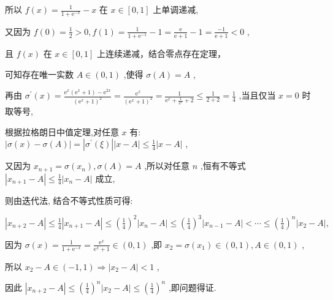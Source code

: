 \documentclass[10pt]{article}
\begin{document}
所以 \(f\left( x\right)  = \frac{1}{1 + {\mathrm{e}}^{-x}} - x\) 在 \(x \in  \left\lbrack  {0,1}\right\rbrack\) 上单调递减,

又因为 \(f\left( 0\right)  = \frac{1}{2} > 0,f\left( 1\right)  = \frac{1}{1 + {\mathrm{e}}^{-1}} - 1 = \frac{\mathrm{e}}{\mathrm{e} + 1} - 1 = \frac{-1}{\mathrm{e} + 1} < 0\) ,

且 \(f\left( x\right)\) 在 \(x \in  \left\lbrack  {0,1}\right\rbrack\) 上连续递减，结合零点存在定理，

可知存在唯一实数 \(A \in  \left( {0,1}\right)\) ,使得 \(\sigma \left( A\right)  = A\) ,

再由 \({\sigma }^{\prime }\left( x\right)  = \frac{{\mathrm{e}}^{x}\left( {{\mathrm{e}}^{x} + 1}\right)  - {\mathrm{e}}^{2x}}{{\left( {\mathrm{e}}^{x} + 1\right) }^{2}} = \frac{{\mathrm{e}}^{x}}{{\left( {\mathrm{e}}^{x} + 1\right) }^{2}} = \frac{1}{{\mathrm{e}}^{x} + \frac{1}{{\mathrm{e}}^{x}} + 2} \leq  \frac{1}{2 + 2} = \frac{1}{4}\) ,当且仅当 \(x = 0\) 时取等号,

根据拉格朗日中值定理,对任意 \(x\) 有: \(\left| {\sigma \left( x\right)  - \sigma \left( A\right) }\right|  = \left| {{\sigma }^{\prime }\left( \xi \right) }\right| \left| {x - A}\right|  \leq  \frac{1}{4}\left| {x - A}\right|\) ,

又因为 \({x}_{n + 1} = \sigma \left( {x}_{n}\right) ,\sigma \left( A\right)  = A\) ,所以对任意 \(n\) ,恒有不等式 \(\left| {{x}_{n + 1} - A}\right|  \leq  \frac{1}{4}\left| {{x}_{n} - A}\right|\) 成立,

则由迭代法, 结合不等式性质可得:

\(\left| {{x}_{n + 2} - A}\right|  \leq  \frac{1}{4}\left| {{x}_{n + 1} - A}\right|  \leq  {\left( \frac{1}{4}\right) }^{2}\left| {{x}_{n} - A}\right|  \leq  {\left( \frac{1}{4}\right) }^{3}\left| {{x}_{n - 1} - A}\right|  < \cdots  \leq  {\left( \frac{1}{4}\right) }^{n}\left| {{x}_{2} - A}\right| ,\)

因为 \(\sigma \left( x\right)  = \frac{1}{1 + {\mathrm{e}}^{-x}} = \frac{{\mathrm{e}}^{x}}{{\mathrm{e}}^{x} + 1} \in  \left( {0,1}\right)\) ,即 \({x}_{2} = \sigma \left( {x}_{1}\right)  \in  \left( {0,1}\right) ,A \in  \left( {0,1}\right)\) ,

所以 \({x}_{2} - A \in  \left( {-1,1}\right)  \Rightarrow  \left| {{x}_{2} - A}\right|  < 1\) ,

因此 \(\left| {{x}_{n + 2} - A}\right|  \leq  {\left( \frac{1}{4}\right) }^{n}\left| {{x}_{2} - A}\right|  \leq  {\left( \frac{1}{4}\right) }^{n}\) ,即问题得证.
\end{document}
